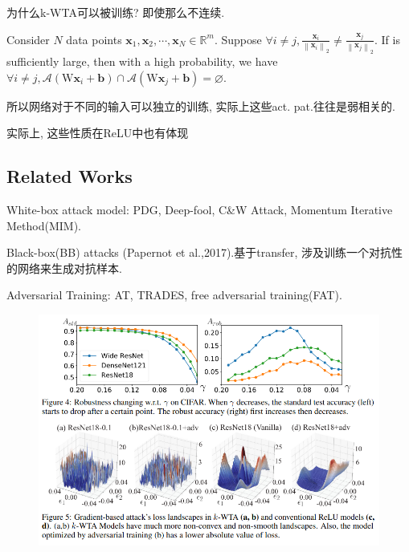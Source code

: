 \documentclass{article}
\begin{document}
为什么k-WTA可以被训练? 即使那么不连续.

\begin{theorem}
    Consider $N$ data points $\boldsymbol{x}_{1}, \boldsymbol{x}_{2}, \cdots, \boldsymbol{x}_{N} \in \mathbb{R}^{m}$. Suppose $\forall i \neq j, \frac{\boldsymbol{x}_{i}}{\left\|\boldsymbol{x}_{i}\right\|_{2}} \neq \frac{\boldsymbol{x}_{j}}{\left\|\boldsymbol{x}_{j}\right\|_{2}} .$ If
    is sufficiently large, then with a high probability, we have $\forall i \neq j, \mathcal{A}\left(\mathrm{W} \boldsymbol{x}_{i}+\boldsymbol{b}\right) \cap \mathcal{A}\left(\mathrm{W} \boldsymbol{x}_{j}+\boldsymbol{b}\right)=\varnothing$.
\end{theorem}
所以网络对于不同的输入可以独立的训练, 实际上这些act. pat.往往是弱相关的.

实际上, 这些性质在ReLU中也有体现

\subsection{Related Works}

White-box attack model: PDG, Deep-fool, C\&W Attack, Momentum Iterative Method(MIM).

Black-box(BB) attacks (Papernot et al.,2017).基于transfer, 涉及训练一个对抗性的网络来生成对抗样本.

Adversarial Training: AT, TRADES, free adversarial training(FAT).
\begin{figure}[htbp]
    \centering
    \includegraphics[width=\textwidth]{kwta-facts.png}
\end{figure}
\end{document}
